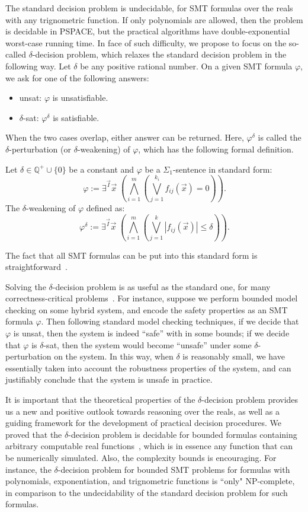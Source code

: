 \documentclass[envcountsect]{llncs}
\begin{document}
The standard decision problem is undecidable, for SMT formulas
over the reals with any trignometric function. If only polynomials are allowed,
then the problem is decidable in {\sf PSPACE}, but the practical algorithms have
double-exponential worst-case running time. In face of such difficulty, we
propose to focus on the so-called $\delta$-decision problem, which relaxes the
standard decision problem in the following way. Let $\delta$ be any positive
rational number. On a given SMT formula $\varphi$, we ask for one of the
following answers:
\begin{itemize}
 \item {\sf unsat}: $\varphi$ is unsatisfiable.
 \item {\sf $\delta$-sat}: $\varphi^{\delta}$ is satisfiable.
\end{itemize}
When the two cases overlap, either answer can be returned. Here,
$\varphi^{\delta}$ is called the $\delta$-perturbation (or $\delta$-weakening)
of $\varphi$, which has the following formal definition. 
\begin{definition}
 Let $\delta\in \mathbb{Q}^+\cup\{0\}$ be a constant and $\varphi$ be a
$\Sigma_1$-sentence in standard form:
\[\varphi:= \exists^{\vec I}\vec x\;(\bigwedge_{i=1}^m (\bigvee_{j=1}^{k_i}
f_{ij}(\vec x)= 0)).
\]
The $\delta$-weakening of $\varphi$ defined as:
\[\varphi^{\delta}:= \exists^{\vec I} \vec x\;(\bigwedge_{i=1}^m(\bigvee_{j=1}^k
|f_{ij}(\vec x)|\leq \delta)).\]
\end{definition}
The fact that all SMT formulas can be put into this standard form is
straightforward~\cite{}. 

Solving the $\delta$-decision problem is as useful as the standard one, for many
correctness-critical problems~\cite{}. For instance, suppose we perform bounded
model checking on some hybrid system, and encode the safety properties as an SMT
formula $\varphi$. Then following standard model checking techniques, if we
decide that $\varphi$ is {\sf unsat}, then the system is indeed ``safe'' with in
some bounds; if we decide that $\varphi$ is {\sf $\delta$-sat}, then the system
would become ``unsafe'' under some $\delta$-perturbation on the system. In this
way, when $\delta$ is reasonably small, we have essentially taken into account 
the robustness properties of the system, and can justifiably conclude that the
system is unsafe in practice. 

It is important that the theoretical properties of the $\delta$-decision problem
provides us a new and positive outlook towards reasoning over the reals, as well
as a guiding framework for the development of practical decision procedures. We
proved that the $\delta$-decision problem is decidable for bounded formulas
containing arbitrary computable real functions~\cite{}, which is in essence any
function that can be numerically simulated. Also, the complexity bounds is
encouraging. For instance, the $\delta$-decision problem for bounded SMT problems for formulas with polynomials,
exponentiation, and trignometric functions is ``only" {\sf NP}-complete, in
comparison to the undecidability of the standard decision problem for such
formulas.  
\end{document}
